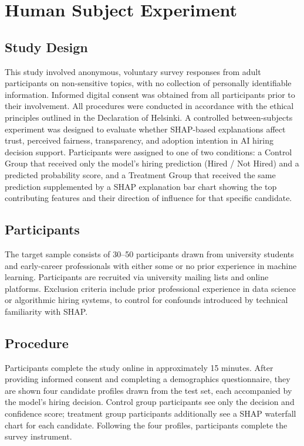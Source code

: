 \documentclass[conference]{IEEEtran}
\begin{document}
\section{Human Subject Experiment}

\subsection{Study Design}

This study involved anonymous, voluntary survey responses from adult participants on non-sensitive topics, with no collection of personally identifiable information. Informed digital consent was obtained from all participants prior to their involvement. All procedures were conducted in accordance with the ethical principles outlined in the Declaration of Helsinki. A controlled between-subjects experiment was designed to evaluate whether SHAP-based explanations affect trust, perceived fairness, transparency, and adoption intention in AI hiring decision support. Participants were assigned to one of two conditions: a Control Group that received only the model's hiring prediction (Hired / Not Hired) and a predicted probability score, and a Treatment Group that received the same prediction supplemented by a SHAP explanation bar chart showing the top contributing features and their direction of influence for that specific candidate.

\subsection{Participants}

The target sample consists of 30--50 participants drawn from university students and early-career professionals with either some or no prior experience in machine learning. Participants are recruited via university mailing lists and online platforms. Exclusion criteria include prior professional experience in data science or algorithmic hiring systems, to control for confounds introduced by technical familiarity with SHAP.

\subsection{Procedure}

Participants complete the study online in approximately 15 minutes. After providing informed consent and completing a demographics questionnaire, they are shown four candidate profiles drawn from the test set, each accompanied by the model's hiring decision. Control group participants see only the decision and confidence score; treatment group participants additionally see a SHAP waterfall chart for each candidate. Following the four profiles, participants complete the survey instrument.
\end{document}
